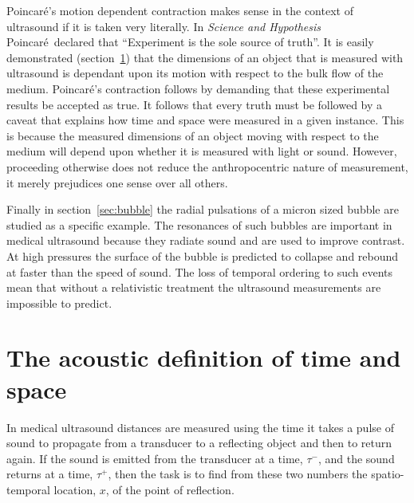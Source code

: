 \documentclass[10pt, fleqn,draft,showtrims,oldfontcommands]{article} %
\newcommand{\secref}[1]{section~\ref{sec:#1}}
\newcommand{\tm}{\tau^-}
\newcommand{\tp}{\tau^+}
\newcommand{\aetherial}{\ae therial}
\newcommand{\Poincare}{Poincar{\'e}}
\begin{document}
\Poincare's motion dependent contraction makes sense in the context of ultrasound if it is taken very literally.
In {\em Science and Hypothesis}\cite{Poincare1902} \Poincare\ declared that ``Experiment is the sole source of truth''.
It is easily demonstrated (\secref{measurement}) that the dimensions of an object that is measured with  ultrasound 
is dependant upon its motion with respect to the bulk flow of the medium.
\Poincare's contraction follows by  demanding that these experimental results be accepted as true.
It follows that  every truth  must be followed by a caveat that explains how time and space were  measured in a given instance.
This is because the measured dimensions of an object moving with respect to the medium  will depend upon whether it is measured with light or sound.
However, proceeding otherwise does not reduce the anthropocentric nature of measurement, it merely prejudices one sense over all others.



Finally in section~\ref{sec:bubble} the radial pulsations of a micron sized bubble are studied as a specific example.
The resonances of such bubbles are important in medical ultrasound because they  radiate sound
and are used to improve contrast.
At high pressures the surface of the bubble is predicted to collapse and rebound at faster than the speed of sound.
The  loss of temporal ordering to such events mean that without a relativistic treatment the ultrasound measurements are impossible  to predict.


\section{The acoustic definition of time and space}\label{sec:measurement}


In medical ultrasound distances are measured using the time it takes a pulse of sound to propagate from a transducer
to a reflecting object and then to return again. 
If the sound is emitted from the transducer at a time, $\tm$,
and the sound returns at a time,  $\tp$,
then the task is to find from these two numbers the spatio-temporal location, $x$,
of the point of reflection.
\end{document}
